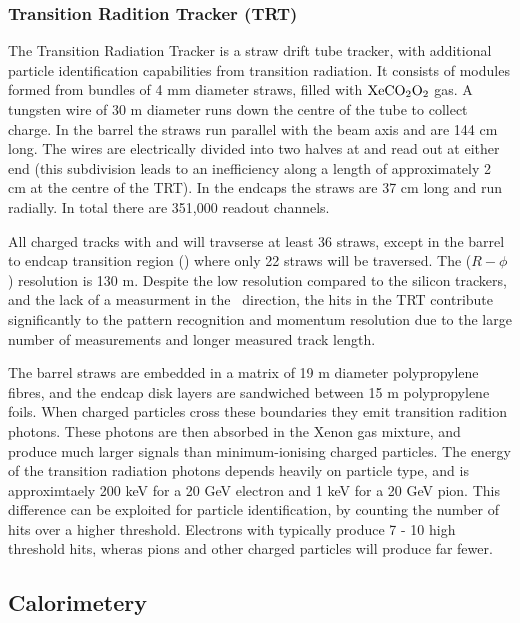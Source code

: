 \subsubsection{Transition Radition Tracker (TRT)}

The Transition Radiation Tracker is a straw drift tube tracker, with additional
particle identification capabilities from transition radiation. It consists of
modules formed from bundles of 4 mm diameter straws, filled with
$\rm{XeCO_{2}O_{2}}$ gas. A tungsten wire of 30 \micro m diameter runs down
the centre of the tube to collect charge. In the barrel the straws run parallel
with the beam axis and are 144 cm long. The wires are electrically divided into two halves at
 and read out at either end (this subdivision leads to an
inefficiency along a length of approximately 2 cm at the centre of the TRT). In
the endcaps the straws are 37 cm long and run radially. In total there are
351,000 readout channels.

All charged tracks with  and  will travserse at least 36
straws, except in the barrel to endcap transition region ()
where only 22 straws will be traversed. The ($R-\phi$) resolution is 130 \micro
m. Despite the low resolution compared to the silicon trackers, and the lack of
a measurment in the \z\ direction, the hits in the TRT contribute significantly
to the pattern recognition and momentum resolution due to the large number of
measurements and longer measured track length.

The barrel straws are embedded in a matrix of 19 \micro m diameter polypropylene
fibres, and the endcap disk layers are sandwiched between 15 \micro m
polypropylene foils. When charged particles cross these boundaries they emit
transition radition photons. These photons are then absorbed in the Xenon gas
mixture, and produce much larger signals than minimum-ionising
charged particles. The energy of the transition radiation photons depends
heavily on particle type, and is approximtaely 200 keV for a 20 GeV electron and
1 keV for a 20 GeV pion. This difference can be exploited for particle
identification, by counting the number of hits over a higher threshold.
Electrons with  typically produce 7 - 10 high threshold hits, wheras
pions and other charged particles will produce far fewer.

\subsection{Calorimetery}

